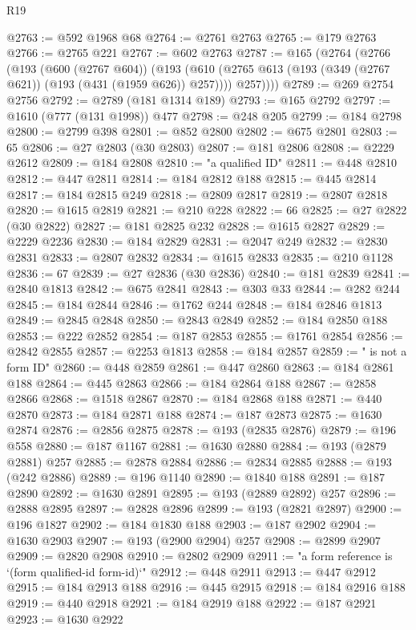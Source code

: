 \begin{lexlean}{R19}
\begin{coremodule}
@2763 := @592 @1968 @68
@2764 := @2761 @2763
@2765 := @179 @2763
@2766 := @2765 @221
@2767 := @602 @2763
@2787 := @165
    (@2764
      (@2766
        (@193
          (@600 (@2767 @604))
          (@193
            (@610 (@2765 @613 (@193 (@349 (@2767 @621)) (@193 (@431 (@1959 @626)) @257))))
            @257))))
@2789 := @269 @2754 @2756
@2792 := @2789 (@181 @1314 @189)
@2793 := @165 @2792
@2797 := @1610 (@777 (@131 @1998)) @477
@2798 := @248 @205
@2799 := @184 @2798
@2800 := @2799 @398
@2801 := @852 @2800
@2802 := @675 @2801
@2803 := 65
@2806 := @27 @2803 (@30 @2803)
@2807 := @181 @2806
@2808 := @2229 @2612
@2809 := @184 @2808
@2810 := "a qualified ID"
@2811 := @448 @2810
@2812 := @447 @2811
@2814 := @184 @2812 @188
@2815 := @445 @2814
@2817 := @184 @2815 @249
@2818 := @2809 @2817
@2819 := @2807 @2818
@2820 := @1615 @2819
@2821 := @210 @228
@2822 := 66
@2825 := @27 @2822 (@30 @2822)
@2827 := @181 @2825 @232
@2828 := @1615 @2827
@2829 := @2229 @2236
@2830 := @184 @2829
@2831 := @2047 @249
@2832 := @2830 @2831
@2833 := @2807 @2832
@2834 := @1615 @2833
@2835 := @210 @1128
@2836 := 67
@2839 := @27 @2836 (@30 @2836)
@2840 := @181 @2839
@2841 := @2840 @1813
@2842 := @675 @2841
@2843 := @303 @33
@2844 := @282 @244
@2845 := @184 @2844
@2846 := @1762 @244
@2848 := @184 @2846 @1813
@2849 := @2845 @2848
@2850 := @2843 @2849
@2852 := @184 @2850 @188
@2853 := @222 @2852
@2854 := @187 @2853
@2855 := @1761 @2854
@2856 := @2842 @2855
@2857 := @2253 @1813
@2858 := @184 @2857
@2859 := " is not a form ID"
@2860 := @448 @2859
@2861 := @447 @2860
@2863 := @184 @2861 @188
@2864 := @445 @2863
@2866 := @184 @2864 @188
@2867 := @2858 @2866
@2868 := @1518 @2867
@2870 := @184 @2868 @188
@2871 := @440 @2870
@2873 := @184 @2871 @188
@2874 := @187 @2873
@2875 := @1630 @2874
@2876 := @2856 @2875
@2878 := @193 (@2835 @2876)
@2879 := @196 @558
@2880 := @187 @1167
@2881 := @1630 @2880
@2884 := @193 (@2879 @2881) @257
@2885 := @2878 @2884
@2886 := @2834 @2885
@2888 := @193 (@242 @2886)
@2889 := @196 @1140
@2890 := @1840 @188
@2891 := @187 @2890
@2892 := @1630 @2891
@2895 := @193 (@2889 @2892) @257
@2896 := @2888 @2895
@2897 := @2828 @2896
@2899 := @193 (@2821 @2897)
@2900 := @196 @1827
@2902 := @184 @1830 @188
@2903 := @187 @2902
@2904 := @1630 @2903
@2907 := @193 (@2900 @2904) @257
@2908 := @2899 @2907
@2909 := @2820 @2908
@2910 := @2802 @2909
@2911 := "a form reference is `(form qualified-id form-id)`"
@2912 := @448 @2911
@2913 := @447 @2912
@2915 := @184 @2913 @188
@2916 := @445 @2915
@2918 := @184 @2916 @188
@2919 := @440 @2918
@2921 := @184 @2919 @188
@2922 := @187 @2921
@2923 := @1630 @2922

\end{coremodule}
\end{lexlean}
